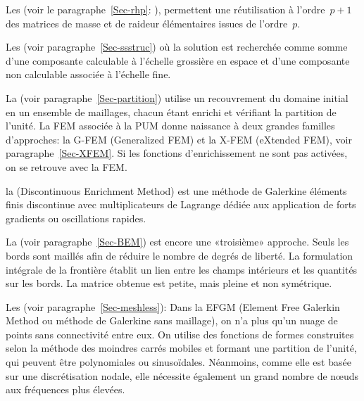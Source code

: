 \medskip
Les  (voir le paragraphe~\ref{Sec-rhp}: ), permettent une réutilisation à l'ordre~$p+1$ des matrices de masse et de raideur élémentaires issues de l'ordre~$p$.

Les  (voir paragraphe~\ref{Sec-ssstruc}) où la solution est recherchée comme somme d'une composante calculable à l'échelle grossière en espace et d'une composante non calculable associée à l'échelle fine.

La  (voir paragraphe~\ref{Sec-partition}) utilise un recouvrement du domaine initial en un ensemble de maillages, chacun étant enrichi et vérifiant la partition de l'unité. La FEM associée à la PUM donne naissance à deux grandes familles d'approches: la G-FEM (Generalized FEM) et la X-FEM (eXtended FEM), voir paragraphe~\ref{Sec-XFEM}. Si les fonctions d'enrichissement ne sont pas activées, on se retrouve avec la FEM.

la  (Discontinuous Enrichment Method) est une méthode de Galerkine éléments finis discontinue avec multiplicateurs de Lagrange dédiée aux application de forts gradients ou oscillations rapides.

\bigskip
La  (voir paragraphe~\ref{Sec-BEM}) est encore une «troisième» approche. Seuls les bords sont maillés afin de réduire le nombre de degrés de liberté. La formulation intégrale de la frontière établit un lien entre les champs intérieurs et les quantités sur les bords. La matrice obtenue est petite, mais pleine et non symétrique.

\bigskip
Les  (voir paragraphe~\ref{Sec-meshless}): Dans la EFGM (Element Free Galerkin Method ou méthode de Galerkine sans maillage), on n'a plus qu'un nuage de points sans connectivité entre eux. On utilise des fonctions de formes construites selon la méthode des moindres carrés mobiles et formant une partition de l'unité, qui peuvent être polynomiales ou sinusoïdales. Néanmoins, comme elle est basée sur une discrétisation nodale, elle nécessite également un grand nombre de nœuds aux fréquences plus élevées.

